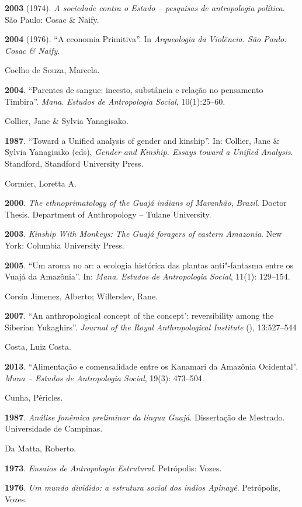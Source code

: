 \textbf{2003} (1974). \emph{A sociedade contra o Estado -- pesquisas de
antropologia política}. São Paulo: Cosac \& Naify.

\textbf{2004} (1976). ``A economia Primitiva''. In \emph{Arqueologia da
Violência. São Paulo: Cosac \& Naify}.

Coelho de Souza, Marcela.

\textbf{2004}. ``Parentes de sangue: incesto, substância e relação no
pensamento Timbira''. \emph{Mana}. \emph{Estudos de Antropologia
Social}, 10(1):25--60.

Collier, Jane \& Sylvia Yanagisako.

\textbf{1987}. ``Toward a Unified analysis of gender and kinship''. In:
Collier, Jane \& Sylvia Yanagisako (eds), \emph{Gender and Kinship.
Essays toward a Unified Analysis}. Standford, Standford University
Press.

Cormier, Loretta A.

\textbf{2000}. \emph{The ethnoprimatology of the Guajá indians of
Maranhão}, \emph{Brazil}. Doctor Thesis. Department of Anthropology --
Tulane University.

\textbf{2003}. \emph{Kinship With Monkeys: The Guajá foragers of eastern
Amazonia}. New York: Columbia University Press.

\textbf{2005}. ``Um aroma no ar: a ecologia histórica das plantas
anti"-fantasma entre os Vuajá da Amazônia''. In: \emph{Mana}.
\emph{Estudos de Antropologia Social}, 11(1): 129--154.

Corsín Jimenez, Alberto; Willerslev, Rane.

\textbf{2007}. ``An anthropological concept of the concept':
reversibility among the Siberian Yukaghirs''. \emph{Journal of the Royal
Anthropological Institute} (), 13:527--544

Costa, Luiz Costa.

\textbf{2013}. ``Alimentação e comensalidade entre os Kanamari da
Amazônia Ocidental''. \emph{Mana -- Estudos de Antropologia Social},
19(3): 473--504.

Cunha, Péricles.

\textbf{1987}. \emph{Análise fonêmica preliminar da língua Guajá}.
Dissertação de Mestrado. Universidade de Campinas.

Da Matta, Roberto.

\textbf{1973}. \emph{Ensaios de Antropologia Estrutural}. Petrópolis:
Vozes.

\textbf{1976}. \emph{Um mundo dividido: a estrutura social dos índios
Apinayé}. Petrópolis, Vozes.

